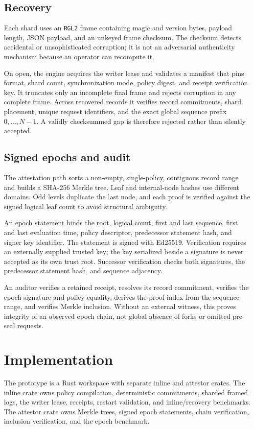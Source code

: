 \documentclass[10pt,twocolumn]{article}
\newcommand{\sha}{SHA-256}
\begin{document}
\subsection{Recovery}
Each shard uses an \texttt{RGL2} frame containing magic and version bytes, payload length, JSON payload, and an unkeyed frame checksum. The checksum detects accidental or unsophisticated corruption; it is not an adversarial authenticity mechanism because an operator can recompute it.

On open, the engine acquires the writer lease and validates a manifest that pins format, shard count, synchronization mode, policy digest, and receipt verification key. It truncates only an incomplete final frame and rejects corruption in any complete frame. Across recovered records it verifies record commitments, shard placement, unique request identifiers, and the exact global sequence prefix $0,\ldots,N-1$. A validly checksummed gap is therefore rejected rather than silently accepted.

\subsection{Signed epochs and audit}
The attestation path sorts a non-empty, single-policy, contiguous record range and builds a \sha{} Merkle tree. Leaf and internal-node hashes use different domains. Odd levels duplicate the last node, and each proof is verified against the signed logical leaf count to avoid structural ambiguity.

An epoch statement binds the root, logical count, first and last sequence, first and last evaluation time, policy descriptor, predecessor statement hash, and signer key identifier. The statement is signed with Ed25519. Verification requires an externally supplied trusted key; the key serialized beside a signature is never accepted as its own trust root. Successor verification checks both signatures, the predecessor statement hash, and sequence adjacency.

An auditor verifies a retained receipt, resolves its record commitment, verifies the epoch signature and policy equality, derives the proof index from the sequence range, and verifies Merkle inclusion. Without an external witness, this proves integrity of an observed epoch chain, not global absence of forks or omitted pre-seal requests.

\section{Implementation}
The prototype is a Rust workspace with separate inline and attestor crates. The inline crate owns policy compilation, deterministic commitments, sharded framed logs, the writer lease, receipts, restart validation, and inline/recovery benchmarks. The attestor crate owns Merkle trees, signed epoch statements, chain verification, inclusion verification, and the epoch benchmark.
\end{document}
